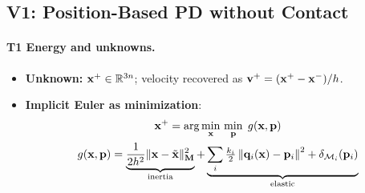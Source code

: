 \subsection{V1: Position-Based PD without Contact}
\label{sec:npd_v1}

\paragraph{T1 Energy and unknowns.}\mbox{}
\begin{itemize}
    \item \textbf{Unknown:} $\mathbf{x}^+ \in \mathbb{R}^{3n}$; velocity recovered as $\mathbf{v}^+ = (\mathbf{x}^+ - \mathbf{x}^-)/h$.
    \item \textbf{Implicit Euler as minimization}:
    \begin{gather}
    \label{eq:npd_v1_objective}
        \mathbf{x}^+ = \arg\min_{\mathbf{x}}\,\min_{\mathbf{p}}\; g(\mathbf{x}, \mathbf{p})
        \\
        g(\mathbf{x}, \mathbf{p}) = \underbrace{\frac{1}{2h^2}\|\mathbf{x} - \tilde{\mathbf{x}}\|^2_{\mathbf{M}}}_{\text{inertia}}
        + \underbrace{\sum_i \tfrac{k_i}{2}\left\|\mathbf{q}_i(\mathbf{x}) - \mathbf{p}_i\right\|^2 + \delta_{\mathcal{M}_i}(\mathbf{p}_i)}_{\text{elastic}}
    \end{gather}
\end{itemize}
